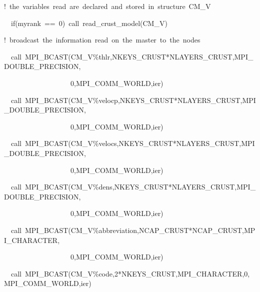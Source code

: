 \documentclass[oneside,english]{book}
\newenvironment{lyxcode}
{\begin{list}{}{
\setlength{\rightmargin}{\leftmargin}
\setlength{\listparindent}{0pt}%
\raggedright
\setlength{\itemsep}{0pt}
\setlength{\parsep}{0pt}
\normalfont\ttfamily}%
 \item[]}
{\end{list}}
\begin{document}
\begin{lyxcode}
{\footnotesize !~the~variables~read~are~declared~and~stored~in~structure~CM\_V~~~~~}{\footnotesize \par}

{\footnotesize{}~~if(myrank~==~0)~call~read\_crust\_model(CM\_V)~}{\footnotesize \par}

{\footnotesize !~broadcast~the~information~read~on~the~master~to~the~nodes~~~~~}{\footnotesize \par}

{\footnotesize{}~~call~MPI\_BCAST(CM\_V\%thlr,NKEYS\_CRUST{*}NLAYERS\_CRUST,MPI\_DOUBLE\_PRECISION,}{\footnotesize \par}

{\footnotesize{}~~~~~~~~~~~~~~~~~~~0,MPI\_COMM\_WORLD,ier)~~~~~}{\footnotesize \par}

{\footnotesize{}~~call~MPI\_BCAST(CM\_V\%velocp,NKEYS\_CRUST{*}NLAYERS\_CRUST,MPI\_DOUBLE\_PRECISION,}{\footnotesize \par}

{\footnotesize{}~~~~~~~~~~~~~~~~~~~0,MPI\_COMM\_WORLD,ier)~~~~~}{\footnotesize \par}

{\footnotesize{}~~call~MPI\_BCAST(CM\_V\%velocs,NKEYS\_CRUST{*}NLAYERS\_CRUST,MPI\_DOUBLE\_PRECISION,}{\footnotesize \par}

{\footnotesize{}~~~~~~~~~~~~~~~~~~~0,MPI\_COMM\_WORLD,ier)~~~~~}{\footnotesize \par}

{\footnotesize{}~~call~MPI\_BCAST(CM\_V\%dens,NKEYS\_CRUST{*}NLAYERS\_CRUST,MPI\_DOUBLE\_PRECISION,}{\footnotesize \par}

{\footnotesize{}~~~~~~~~~~~~~~~~~~~0,MPI\_COMM\_WORLD,ier)~~~~~}{\footnotesize \par}

{\footnotesize{}~~call~MPI\_BCAST(CM\_V\%abbreviation,NCAP\_CRUST{*}NCAP\_CRUST,MPI\_CHARACTER,}{\footnotesize \par}

{\footnotesize{}~~~~~~~~~~~~~~~~~~~0,MPI\_COMM\_WORLD,ier)~~~~~}{\footnotesize \par}

{\footnotesize{}~~call~MPI\_BCAST(CM\_V\%code,2{*}NKEYS\_CRUST,MPI\_CHARACTER,0,MPI\_COMM\_WORLD,ier)~}{\footnotesize \par}
\end{lyxcode}
\end{document}
